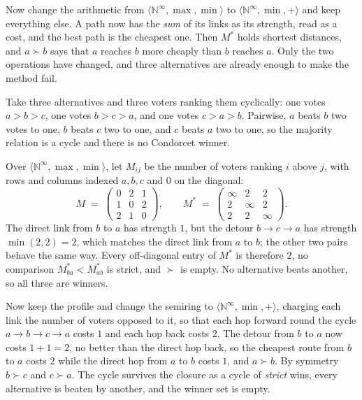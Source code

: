 \documentclass[a4paper,UKenglish,cleveref,autoref,thm-restate,anonymous]{lipics-v2021}
\newcommand{\Mstar}{M^{\ast}}
\begin{document}
Now change the arithmetic from $\langle \mathbb{N}^{\infty}, \max,
\min\rangle$ to $\langle \mathbb{N}^{\infty}, \min, +\rangle$ and keep
everything else. A path now has the \emph{sum} of its links as its
strength, read as a cost, and the best path is the cheapest one. Then
$\Mstar$ holds shortest distances, and $a \succ b$ says that $a$ reaches
$b$ more cheaply than $b$ reaches $a$. Only the two operations have
changed, and three alternatives are already enough to make the method
fail.

\begin{example}\label{ex:tropical}
Take three alternatives and three voters ranking them cyclically: one votes
$a > b > c$, one votes $b > c > a$, and one votes $c > a > b$. Pairwise, $a$
beats $b$ two votes to one, $b$ beats $c$ two to one, and $c$ beats $a$ two
to one, so the majority relation is a cycle and there is no Condorcet
winner.

Over $\langle \mathbb{N}^{\infty}, \max, \min\rangle$, let $M_{ij}$ be the
number of voters ranking $i$ above $j$, with rows and columns indexed
$a,b,c$ and $0$ on the diagonal:
\[
  M \;=\;
  \begin{pmatrix}
    0 & 2 & 1 \\
    1 & 0 & 2 \\
    2 & 1 & 0
  \end{pmatrix},
  \qquad
  \Mstar \;=\;
  \begin{pmatrix}
    \infty & 2 & 2 \\
    2 & \infty & 2 \\
    2 & 2 & \infty
  \end{pmatrix}.
\]
The direct link from $b$ to $a$ has strength $1$, but the detour
$b \to c \to a$ has strength $\min(2,2) = 2$, which matches the direct link
from $a$ to $b$; the other two pairs behave the same way. Every
off-diagonal entry of $\Mstar$ is therefore $2$, no comparison
$\Mstar_{ba} < \Mstar_{ab}$ is strict, and $\succ$ is empty. No alternative
beats another, so all three are winners.

Now keep the profile and change the semiring to $\langle \mathbb{N}^{\infty},
\min, +\rangle$, charging each link the number of voters opposed to it, so
that each hop forward round the cycle $a \to b \to c \to a$ costs $1$ and
each hop back costs $2$. The detour from $b$ to $a$ now costs $1 + 1 = 2$,
no better than the direct hop back, so the cheapest route from $b$ to $a$
costs $2$ while the direct hop from $a$ to $b$ costs $1$, and $a \succ b$.
By symmetry $b \succ c$ and $c \succ a$. The cycle survives the closure as
a cycle of \emph{strict} wins, every alternative is beaten by another, and
the winner set is empty.
\end{example}
\end{document}
